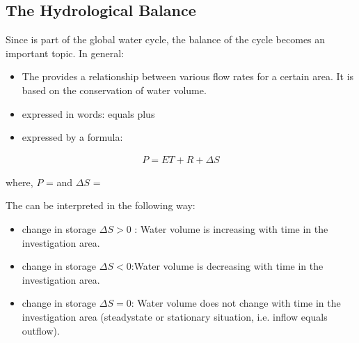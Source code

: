 \documentclass[letterpaper,10pt,english]{sphinxmanual}
\begin{document}
\subsection{The Hydrological Balance}
\label{\detokenize{contents/background/03_basic_hydrogeology:the-hydrological-balance}}
Since  is part of the global water cycle, the balance of the cycle becomes an important topic. In general:
\begin{itemize}
\item {} 
The  provides a relationship between various flow rates for a certain area. It is based on the conservation of water volume.

\item {} 
expressed in words:   equals  plus 

\item {} 
expressed by a formula:

\end{itemize}
\begin{equation*}
\begin{split}
P = ET + R + \Delta S
\end{split}
\end{equation*}
\begin{sphinxShadowBox}

where, 
\(P\) =   and  \(\Delta S\) = 
\end{sphinxShadowBox}

The  can be interpreted in the following way:
\begin{itemize}
\item {} 
change in storage \(\Delta S > 0\) : Water volume is increasing with time in the investigation area.

\item {} 
change in storage \(\Delta S < 0\):Water volume is decreasing with time in the investigation area.

\item {} 
change in storage \(\Delta S = 0\): Water volume does not change with time in the investigation area (steady\sphinxhyphen{}state or stationary situation, i.e. inflow equals outflow).

\end{itemize}
\end{document}
